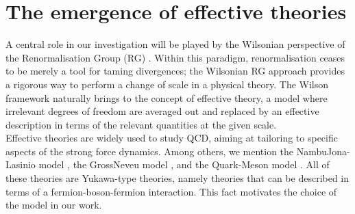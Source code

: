 \section{The emergence of effective theories}
A central role in our investigation will be played by the Wilsonian perspective of the Renormalisation Group (RG) \cite{WilsonRG1,WilsonRG2,WILSON197475}. Within this paradigm, renormalisation ceases to be merely a tool for taming divergences; 
the Wilsonian RG approach provides a rigorous way to perform a change of scale in a physical theory. The Wilson framework naturally brings to the concept of effective theory, a model where irrelevant degrees of freedom are averaged out and replaced by an effective description in terms of the relevant quantities at the given scale.  \\
Effective theories are widely used to study QCD, aiming at tailoring to specific aspects of the strong force dynamics. 
Among others, we mention the Nambu\textendash{}Jona-Lasinio model \cite{Nambu1961DynamicalI, Nambu1961DynamicalII}, the Gross\textendash{}Neveu model \cite{grossneveu}, and the Quark-Meson model \cite{quarkmeson1,quarkmeson2,quarkmeson3}. All of these theories are Yukawa-type theories, namely theories that can be described in terms of a fermion-boson-fermion interaction. This fact motivates the choice of the model in our work.

